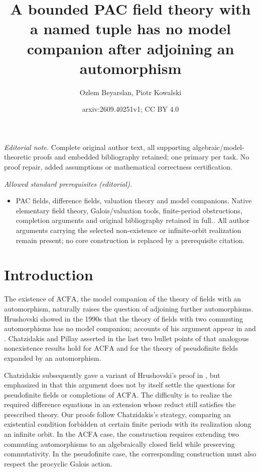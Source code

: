\documentclass[10pt,a4paper]{amsart}
\title{A bounded PAC field theory with a named tuple has no model companion after adjoining an automorphism}
\author{Ozlem Beyarslan, Piotr Kowalski}
\date{arxiv:2609.40251v1; CC BY 4.0}
\theoremstyle{definition}
\newcommand{\ACFA}{\mathrm{ACFA}}
\begin{document}
\maketitle
\noindent\textit{Editorial note.} Complete original author text, all supporting algebraic/model-theoretic proofs and embedded bibliography retained; one primary per task. No proof repair, added assumptions or mathematical correctness certification.\par\medskip
\noindent\textit{Allowed standard prerequisites (editorial).}\begin{itemize}
\item PAC fields, difference fields, valuation theory and model companions. Native elementary field theory, Galois/valuation tools, finite-period obstructions, completion arguments and original bibliography retained in full.. All author arguments carrying the selected non-existence or infinite-orbit realization remain present; no core construction is replaced by a prerequisite citation.
\end{itemize}\medskip
\section{Introduction}\label{sec:introduction}

The existence of $\ACFA$, the model companion of the theory of
fields with an automorphism, naturally raises the question of
adjoining further automorphisms. Hrushovski showed in the 1990s that the theory of fields
with two commuting automorphisms has no model companion;
accounts of his argument appear in
\cite[Section~3]{KikyoSurvey} and
\cite[Section~1.11]{Survey}. 
Chatzidakis and Pillay asserted in the last two bullet points
of \cite[Section~3.11]{CP} that analogous nonexistence results
hold for $\ACFA$ and for the theory of pseudofinite fields
expanded by an automorphism.

Chatzidakis subsequently gave a variant of Hrushovski's proof
in \cite[Section~1.11]{Survey}, but emphasized in
\cite[Remark~1.12]{Survey} that this argument does not by itself
settle the questions for pseudofinite fields or completions of
$\ACFA$. The difficulty is to realize the required difference
equations in an extension whose reduct still satisfies the
prescribed theory. Our proofs follow Chatzidakis's strategy, comparing an
existential condition forbidden at certain finite periods with
its realization along an infinite orbit.
 In the $\ACFA$ case, the construction requires
extending two commuting automorphisms to an algebraically closed
field while preserving commutativity. In the pseudofinite case,
the corresponding construction must also respect the procyclic
Galois action.
\end{document}
